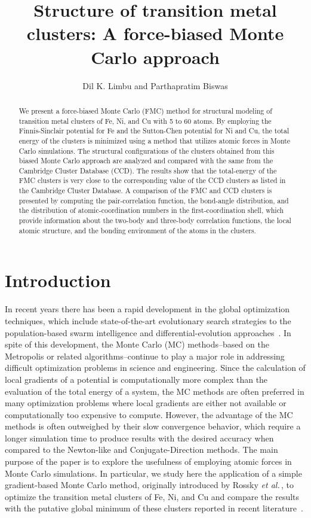 \documentclass[a4paper]{jpconf}
\def\etal{\it et al.\,}
\begin{document}
\title{Structure of transition metal clusters: A force-biased 
Monte Carlo approach}
\author{Dil K. Limbu and Parthapratim Biswas}
\address{Department of Physics and Astronomy, The University of 
Southern Mississippi, Hattiesburg, Mississippi 39406, USA}

\begin{abstract}
We present a force-biased Monte Carlo (FMC) method 
for structural modeling of transition metal clusters 
of Fe, Ni, and Cu with 5 to 60 atoms. By employing 
the Finnis-Sinclair potential for Fe and the Sutton-Chen 
potential for Ni and Cu, the total energy of the 
clusters is minimized using a method that utilizes 
atomic forces in Monte Carlo simulations.  
The structural configurations of the clusters 
obtained from this biased Monte Carlo approach are 
analyzed and compared with the same from the Cambridge 
Cluster Database (CCD).
The results show that the total-energy of the FMC clusters 
is very close to the corresponding value of the CCD 
clusters as listed in the Cambridge Cluster Database.  A comparison 
of the FMC and CCD clusters is presented by computing 
the pair-correlation function, the bond-angle distribution, 
and the distribution of atomic-coordination numbers in 
the first-coordination shell, which provide information 
about the two-body and three-body correlation 
functions, the local atomic structure, and the bonding 
environment of the atoms in the clusters. 
\end{abstract}

\section{Introduction}
In recent years there has been a rapid development in 
the global optimization techniques, which include state-of-the-art 
evolutionary search strategies to the population-based swarm 
intelligence and differential-evolution approaches~\cite{Engel}. 
In spite of this development, the Monte Carlo (MC) 
methods--based on the Metropolis or related algorithms--continue 
to play a major role in addressing difficult optimization 
problems in science and engineering. Since the calculation of local gradients of 
a potential is computationally more complex than the evaluation of the 
total energy of a system, the MC methods are often preferred 
in many optimization problems where local gradients are 
either not available or computationally too expensive to 
compute.  However, the advantage of the MC methods is often 
outweighed by their slow convergence behavior, which 
require a longer simulation time to produce results with the 
desired accuracy when compared to the Newton-like and
Conjugate-Direction methods.  The main purpose of the 
paper is to explore the usefulness of employing atomic 
forces in Monte Carlo simulations. In particular, we study here 
the application of a simple gradient-based Monte Carlo 
method, originally introduced by Rossky {\etal}\cite{Rossky1978,Allen}, 
to optimize the transition metal clusters of Fe, Ni, and Cu 
and compare the results with the putative global minimum 
of these clusters reported in recent literature~\cite{Elliott2009a,Doye1998}. 
\end{document}
